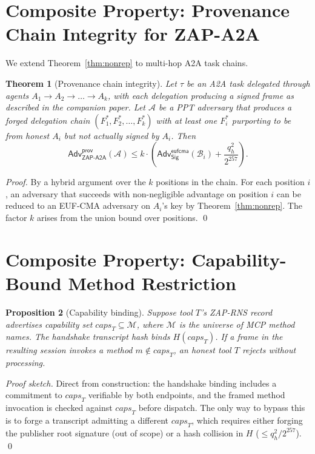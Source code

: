 \documentclass[11pt,a4paper]{article}
\newtheorem{theorem}{Theorem}
\newtheorem{proposition}[theorem]{Proposition}
\theoremstyle{definition}
\theoremstyle{remark}
\newcommand{\zapaa}{\textsf{ZAP-A2A}\xspace}
\newcommand{\mcp}{\textsf{MCP}\xspace}
\newcommand{\aatwo}{\textsf{A2A}\xspace}
\newcommand{\rns}{\textsf{ZAP-RNS}\xspace}
\newcommand{\Adv}{\mathsf{Adv}}
\newcommand{\Sign}{\textsf{Sig}}
\begin{document}
\section{Composite Property: Provenance Chain Integrity for \zapaa{}}

We extend Theorem~\ref{thm:nonrep} to multi-hop \aatwo{} task chains.

\begin{theorem}[Provenance chain integrity]\label{thm:prov}
Let $\tau$ be an \aatwo{} task delegated through agents
$A_1 \to A_2 \to \dots \to A_k$, with each delegation producing a
signed frame as described in the companion paper. Let $\mathcal{A}$
be a PPT adversary that produces a forged delegation chain
$(F_1^*, F_2^*, \dots, F_k^*)$ with at least one $F_i^*$ purporting to
be from honest $A_i$ but not actually signed by $A_i$. Then
\[
\Adv^{\mathsf{prov}}_{\zapaa{}}(\mathcal{A}) \leq
k \cdot \left(
\Adv^{\mathsf{eufcma}}_{\Sign}(\mathcal{B}_i) + \frac{q_h^2}{2^{257}}
\right).
\]
\end{theorem}

\begin{proof}
By a hybrid argument over the $k$ positions in the chain. For each
position $i$, an adversary that succeeds with non-negligible advantage
on position $i$ can be reduced to an EUF-CMA adversary on $A_i$'s key
by Theorem~\ref{thm:nonrep}. The factor $k$ arises from the union bound
over positions.
\qed
\end{proof}

\section{Composite Property: Capability-Bound Method Restriction}

\begin{proposition}[Capability binding]\label{prop:caps}
Suppose tool $T$'s \rns{} record advertises capability set
$\mathit{caps}_T \subseteq \mathcal{M}$, where $\mathcal{M}$ is the
universe of \mcp{} method names. The handshake transcript hash binds
$H(\mathit{caps}_T)$. If a frame in the resulting session invokes a
method $m \notin \mathit{caps}_T$, an honest tool $T$ rejects without
processing.
\end{proposition}

\begin{proof}[Proof sketch]
Direct from construction: the handshake binding includes a commitment
to $\mathit{caps}_T$ verifiable by both endpoints, and the framed
method invocation is checked against $\mathit{caps}_T$ before
dispatch. The only way to bypass this is to forge a transcript
admitting a different $\mathit{caps}_T$, which requires either
forging the publisher root signature (out of scope) or a hash
collision in $H$ ($\leq q_h^2 / 2^{257}$).
\qed
\end{proof}
\end{document}

